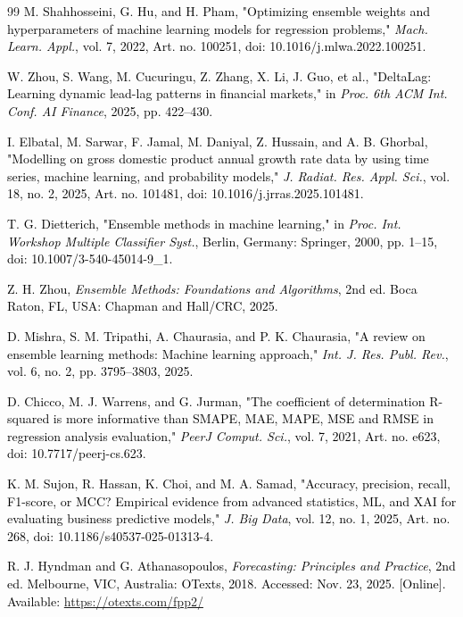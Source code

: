 \documentclass[final, 9pt, twocolumn]{saucis}
\newcommand{\rev}[1]{\textcolor{black}{#1}}
\begin{document}
\begin{thebibliography}{99}
 \rev{M. Shahhosseini, G. Hu, and H. Pham, "Optimizing ensemble weights and hyperparameters of machine learning models for regression problems," \emph{Mach. Learn. Appl.}, vol. 7, 2022, Art. no. 100251, doi: 10.1016/j.mlwa.2022.100251.}

 \rev{W. Zhou, S. Wang, M. Cucuringu, Z. Zhang, X. Li, J. Guo, et al., "DeltaLag: Learning dynamic lead-lag patterns in financial markets," in \emph{Proc. 6th ACM Int. Conf. AI Finance}, 2025, pp. 422--430.}

 \rev{I. Elbatal, M. Sarwar, F. Jamal, M. Daniyal, Z. Hussain, and A. B. Ghorbal, "Modelling on gross domestic product annual growth rate data by using time series, machine learning, and probability models," \emph{J. Radiat. Res. Appl. Sci.}, vol. 18, no. 2, 2025, Art. no. 101481, doi: 10.1016/j.jrras.2025.101481.}

 \rev{T. G. Dietterich, "Ensemble methods in machine learning," in \emph{Proc. Int. Workshop Multiple Classifier Syst.}, Berlin, Germany: Springer, 2000, pp. 1--15, doi: 10.1007/3-540-45014-9\_1.}

 \rev{Z. H. Zhou, \emph{Ensemble Methods: Foundations and Algorithms}, 2nd ed. Boca Raton, FL, USA: Chapman and Hall/CRC, 2025.}

 \rev{D. Mishra, S. M. Tripathi, A. Chaurasia, and P. K. Chaurasia, "A review on ensemble learning methods: Machine learning approach," \emph{Int. J. Res. Publ. Rev.}, vol. 6, no. 2, pp. 3795--3803, 2025.}

 \rev{D. Chicco, M. J. Warrens, and G. Jurman, "The coefficient of determination R-squared is more informative than SMAPE, MAE, MAPE, MSE and RMSE in regression analysis evaluation," \emph{PeerJ Comput. Sci.}, vol. 7, 2021, Art. no. e623, doi: 10.7717/peerj-cs.623.}

 \rev{K. M. Sujon, R. Hassan, K. Choi, and M. A. Samad, "Accuracy, precision, recall, F1-score, or MCC? Empirical evidence from advanced statistics, ML, and XAI for evaluating business predictive models," \emph{J. Big Data}, vol. 12, no. 1, 2025, Art. no. 268, doi: 10.1186/s40537-025-01313-4.}

 \rev{R. J. Hyndman and G. Athanasopoulos, \emph{Forecasting: Principles and Practice}, 2nd ed. Melbourne, VIC, Australia: OTexts, 2018. Accessed: Nov. 23, 2025. [Online]. Available: \url{https://otexts.com/fpp2/}}


\end{thebibliography}
\end{document}
